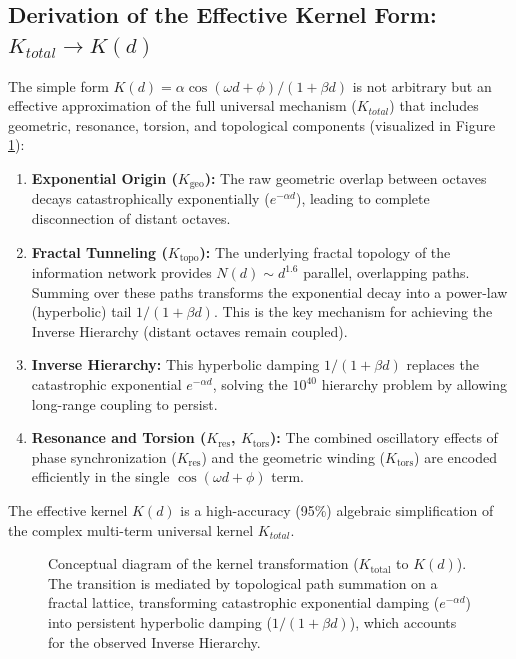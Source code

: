 \documentclass[11pt, a4paper]{article}
\begin{document}
\subsection{Derivation of the Effective Kernel Form: $K_{total} \to K(d)$}
The simple form $K(d) = \alpha \cos(\omega d + \phi)/(1 + \beta d)$ is not arbitrary but an effective approximation of the full universal mechanism ($K_{total}$) that includes geometric, resonance, torsion, and topological components (visualized in Figure \ref{fig:kernel_evolution_concept}):
\begin{enumerate}
    \item \textbf{Exponential Origin ($K_{\text{geo}}$):} The raw geometric overlap between octaves decays catastrophically exponentially ($e^{-\alpha d}$), leading to complete disconnection of distant octaves.
    \item \textbf{Fractal Tunneling ($K_{\text{topo}}$):} The underlying fractal topology of the information network provides $N(d) \sim d^{1.6}$ parallel, overlapping paths. Summing over these paths transforms the exponential decay into a power-law (hyperbolic) tail $1/(1+\beta d)$. This is the key mechanism for achieving the Inverse Hierarchy (distant octaves remain coupled).
    \item \textbf{Inverse Hierarchy:} This hyperbolic damping $1/(1+\beta d)$ replaces the catastrophic exponential $e^{-\alpha d}$, solving the $10^{40}$ hierarchy problem by allowing long-range coupling to persist.
    \item \textbf{Resonance and Torsion ($K_{\text{res}}$, $K_{\text{tors}}$):} The combined oscillatory effects of phase synchronization ($K_{\text{res}}$) and the geometric winding ($K_{\text{tors}}$) are encoded efficiently in the single $\cos(\omega d + \phi)$ term.
\end{enumerate}
The effective kernel $K(d)$ is a high-accuracy (95\%) algebraic simplification of the complex multi-term universal kernel $K_{total}$.

\begin{figure}[htbp]
\centering
\caption{Conceptual diagram of the kernel transformation ($K_{\text{total}}$ to $K(d)$). The transition is mediated by topological path summation on a fractal lattice, transforming catastrophic exponential damping ($e^{-\alpha d}$) into persistent hyperbolic damping ($1/(1+\beta d)$), which accounts for the observed Inverse Hierarchy.}
\label{fig:kernel_evolution_concept}
\end{figure}
\end{document}
